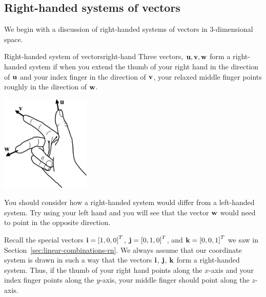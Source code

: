 \subsection{Right-handed systems of vectors}

We begin with a discussion of right-handed systems of vectors in
$3$-dimensional
space.

\begin{definition}{Right-handed system of vectors}{right-hand}
  Three vectors, $\vect{u},\vect{v},\vect{w}$ form a right-handed
  system if when you extend the thumb of your right hand in the
  direction of $\vect{u}$ and your index finger in the direction of
  $\vect{v}$, your relaxed middle finger points roughly in the
  direction of $\vect{w}$.
  \begin{center}
    \hspace{1in}
    \includegraphics[height=1.8in]{figures/right-handed}
  \end{center}
\end{definition}

You should consider how a right-handed system would differ from a
left-handed system. Try using your left hand and you will see that the
vector $\vect{w}$ would need to point in the opposite direction.

Recall the special vectors $\vect{i}=\mat{1,0,0}^T$,
$\vect{j}=\mat{0,1,0}^T$, and $\vect{k}=\mat{0,0,1}^T$ we saw in
Section~\ref{sec:linear-combinations-rn}. We always assume that our
coordinate system is drawn in such a way that the vectors $\vect{i}$,
$\vect{j}$, $\vect{k}$ form a right-handed system. Thus, if the thumb
of your right hand points along the $x$-axis and your index finger
points along the $y$-axis, your middle finger should point along the
$z$-axis.

